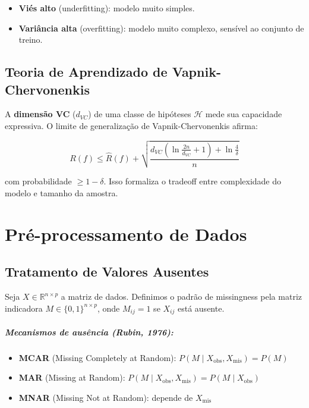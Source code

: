 \documentclass[12pt,a4paper,twoside]{book}
\theoremstyle{definition}
\theoremstyle{remark}
\newcommand{\R}{\mathbb{R}}
\begin{document}
\begin{itemize}
  \item \textbf{Viés alto} (underfitting): modelo muito simples.
  \item \textbf{Variância alta} (overfitting): modelo muito complexo, sensível ao conjunto de treino.
\end{itemize}

\section{Teoria de Aprendizado de Vapnik-Chervonenkis}

A \textbf{dimensão VC} ($d_{VC}$) de uma classe de hipóteses $\mathcal{H}$ mede sua capacidade expressiva. O limite de generalização de Vapnik-Chervonenkis afirma:

\[
R(f) \leq \hat{R}(f) + \sqrt{\frac{d_{VC}\left(\ln\frac{2n}{d_{VC}} + 1\right) + \ln\frac{4}{\delta}}{n}}
\]

com probabilidade $\geq 1 - \delta$. Isso formaliza o tradeoff entre complexidade do modelo e tamanho da amostra.

\chapter{Pré-processamento de Dados}

\section{Tratamento de Valores Ausentes}

Seja $X \in \R^{n \times p}$ a matriz de dados. Definimos o padrão de missingness pela matriz indicadora $M \in \{0,1\}^{n \times p}$, onde $M_{ij} = 1$ se $X_{ij}$ está ausente.

\paragraph{Mecanismos de ausência (Rubin, 1976):}
\begin{itemize}
  \item \textbf{MCAR} (Missing Completely at Random): $P(M \mid X_{\text{obs}}, X_{\text{mis}}) = P(M)$
  \item \textbf{MAR} (Missing at Random): $P(M \mid X_{\text{obs}}, X_{\text{mis}}) = P(M \mid X_{\text{obs}})$
  \item \textbf{MNAR} (Missing Not at Random): depende de $X_{\text{mis}}$
\end{itemize}
\end{document}
